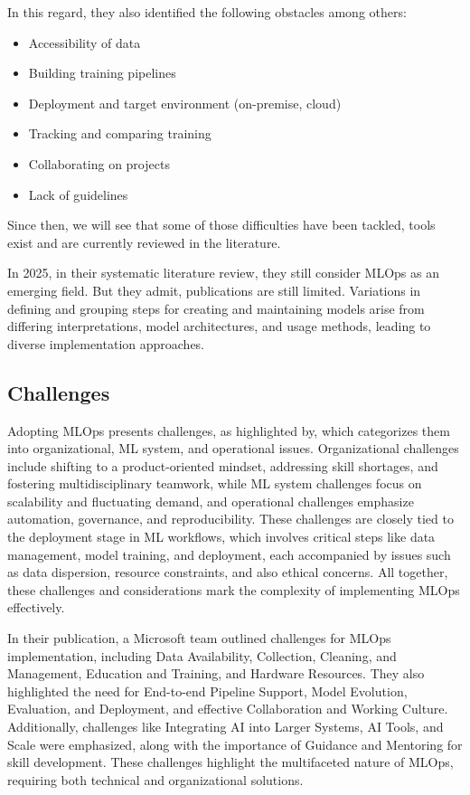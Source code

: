 In this regard, they also identified the following obstacles among others\cite{DBLP:journals/corr/abs-2103-08942}:
    \begin{itemize}
        \item Accessibility of data
        \item Building training pipelines
        \item Deployment and target environment (on-premise, cloud)
        \item Tracking and comparing training
        \item Collaborating on projects
        \item Lack of guidelines
    \end{itemize}

Since then, we will see that some of those difficulties have been tackled, tools exist and are currently reviewed in the literature.

In 2025, in their systematic literature review\cite{10855428}, they still consider MLOps as an emerging field.
But they admit, publications are still limited.
Variations in defining and grouping steps for creating and maintaining models arise from differing interpretations,
model architectures, and usage methods, leading to diverse implementation approaches.

\subsection{Challenges}\label{subsec:challenges}

Adopting MLOps presents challenges, as highlighted by\cite{Kreuzberger2022MachineLO}, which categorizes them into organizational,
ML system, and operational issues.
Organizational challenges include shifting to a product-oriented mindset, addressing skill shortages,
and fostering multidisciplinary teamwork, while ML system challenges focus on scalability and fluctuating demand,
and operational challenges emphasize automation, governance, and reproducibility.
These challenges are closely tied to the deployment stage in ML workflows, which involves critical steps like data management,
model training, and deployment, each accompanied by issues such as data dispersion, resource constraints, and also ethical concerns\cite{10.1145/3533378}.
All together, these challenges and considerations mark the complexity of implementing MLOps effectively.

In their publication, a Microsoft team\cite{8804457} outlined challenges for MLOps implementation, including Data Availability, Collection, Cleaning, and Management,
Education and Training, and Hardware Resources.
They also highlighted the need for End-to-end Pipeline Support, Model Evolution, Evaluation, and Deployment, and effective Collaboration and Working Culture.
Additionally, challenges like Integrating AI into Larger Systems, AI Tools, and Scale were emphasized,
along with the importance of Guidance and Mentoring for skill development.
These challenges highlight the multifaceted nature of MLOps, requiring both technical and organizational solutions.

